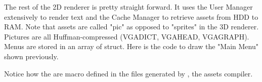 \par
The rest of the 2D renderer is pretty straight forward. It uses the User Manager extensively to render text and the Cache Manager to retrieve assets from HDD to RAM. Note that assets are called "pic" as opposed to "sprites" in the 3D renderer. Pictures are all Huffman-compressed (VGADICT, VGAHEAD, VGAGRAPH). Menus are stored in an array of struct. Here is the code to draw the "Main Menu" shown previously.\\

\par
\begin{minipage}{\textwidth}

\end{minipage}

\par
\begin{minipage}{\textwidth}

\end{minipage}
\par
Notice how the  are macro defined in the files generated by , the assets compiler.

